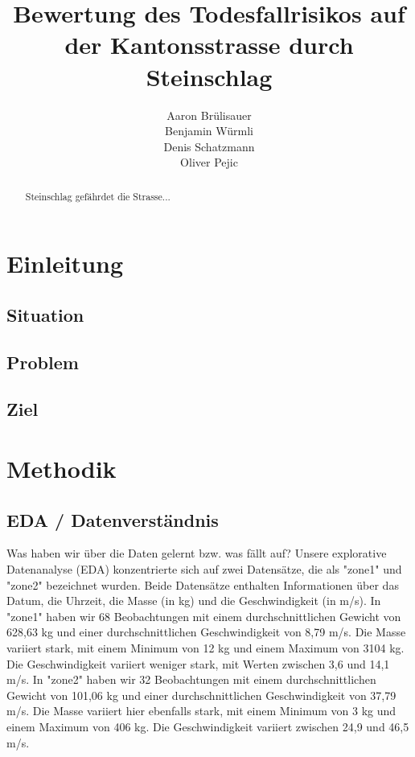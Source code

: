 \documentclass[a4paper,10pt]{report}
\title{Bewertung des Todesfallrisikos auf der Kantonsstrasse durch Steinschlag}
\author{Aaron Brülisauer\\Benjamin Würmli\\Denis Schatzmann\\Oliver Pejic}
\begin{document}
    \maketitle

    \begin{abstract}
        Steinschlag gefährdet die Strasse...
    \end{abstract}

    \tableofcontents


    \chapter{Einleitung}


    \section{Situation}


    \section{Problem}


    \section{Ziel}

    \chapter{Methodik}


    \section{EDA / Datenverständnis}
    Was haben wir über die Daten gelernt bzw. was fällt auf?
    Unsere explorative Datenanalyse (EDA) konzentrierte sich auf zwei Datensätze, die als "zone1" und "zone2" bezeichnet wurden. 
    Beide Datensätze enthalten Informationen über das Datum, die Uhrzeit, die Masse (in kg) und die Geschwindigkeit (in m/s).
    In "zone1" haben wir 68 Beobachtungen mit einem durchschnittlichen Gewicht von 628,63 kg und einer durchschnittlichen Geschwindigkeit von 8,79 m/s. 
    Die Masse variiert stark, mit einem Minimum von 12 kg und einem Maximum von 3104 kg. Die Geschwindigkeit variiert weniger stark, mit Werten zwischen 3,6 und 14,1 m/s.
    In "zone2" haben wir 32 Beobachtungen mit einem durchschnittlichen Gewicht von 101,06 kg und einer durchschnittlichen Geschwindigkeit von 37,79 m/s. 
    Die Masse variiert hier ebenfalls stark, mit einem Minimum von 3 kg und einem Maximum von 406 kg. Die Geschwindigkeit variiert zwischen 24,9 und 46,5 m/s.
\end{document}
